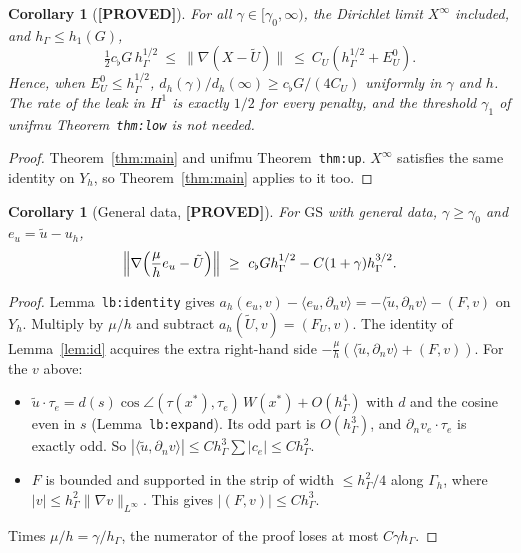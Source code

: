 \documentclass[11pt]{article}
\newtheorem{corollary}[theorem]{Corollary}
\theoremstyle{remark}
\newcommand{\hG}{h_\Gamma}
\newcommand{\Gh}{\Gamma_h}
\newcommand{\Yh}{Y_h}
\newcommand{\norm}[1]{\|#1\|}
\newcommand{\ip}[2]{\langle #1,#2\rangle}
\newcommand{\dn}{\partial_n}
\newcommand{\Ut}{\tilde U}
\newcommand{\ut}{\tilde u}
\newcommand{\lab}[1]{\textbf{[#1]}}
\newcommand{\GS}{\mathrm{GS}}
\begin{document}
\begin{corollary}[\lab{PROVED}]\label{cor:two}
For all $\gamma\in[\gamma_0,\infty)$, the Dirichlet limit $X^\infty$ included, and $\hG\le h_1(G)$,
\[
\tfrac12c_\flat G\,\hG^{1/2}\ \le\ \norm{\nabla(X-\Ut)}\ \le\ C_U(\hG^{1/2}+E^0_U).
\]
Hence, when $E^0_U\le\hG^{1/2}$, $d_h(\gamma)/d_h(\infty)\ge c_\flat G/(4C_U)$ uniformly in $\gamma$ and $h$. The rate of the leak in $H^1$ is exactly $1/2$ for every penalty, and the threshold $\gamma_1$ of unifmu Theorem~\texttt{thm:low} is not needed.
\end{corollary}
\begin{proof}
Theorem~\ref{thm:main} and unifmu Theorem~\texttt{thm:up}. $X^\infty$ satisfies the same identity on $\Yh$, so Theorem~\ref{thm:main} applies to it too.
\end{proof}

\begin{corollary}[General data, \lab{PROVED}]\label{cor:gen}
For $\GS$ with general data, $\gamma\ge\gamma_0$ and $e_u=\ut-u_h$,
\[
\Bigl\|\nabla\Bigl(\frac\mu he_u-\Ut\Bigr)\Bigr\|\ \ge\ c_\flat G\hG^{1/2}-C(1+\gamma)\hG^{3/2}.
\]
\end{corollary}
\begin{proof}
Lemma~\texttt{lb:identity} gives $a_h(e_u,v)-\ip{e_u}{\dn v}=-\ip{\ut}{\dn v}-(F,v)$ on $\Yh$. Multiply by $\mu/h$ and subtract $a_h(\Ut,v)=(F_U,v)$. The identity of Lemma~\ref{lem:id} acquires the extra right-hand side $-\frac\mu h(\ip{\ut}{\dn v}+(F,v))$. For the $v$ above:
\begin{itemize}
\item $\ut\cdot\tau_e=d(s)\cos\angle(\tau(x^\ast),\tau_e)\,W(x^\ast)+O(\hG^4)$ with $d$ and the cosine even in $s$ (Lemma~\texttt{lb:expand}). Its odd part is $O(\hG^3)$, and $\dn v_e\cdot\tau_e$ is exactly odd. So $|\ip{\ut}{\dn v}|\le C\hG^3\sum|c_e|\le C\hG^2$.
\item $F$ is bounded and supported in the strip of width $\le\hG^2/4$ along $\Gh$, where $|v|\le\hG^2\norm{\nabla v}_{L^\infty}$. This gives $|(F,v)|\le C\hG^3$.
\end{itemize}
Times $\mu/h=\gamma/\hG$, the numerator of the proof loses at most $C\gamma\hG$.
\end{proof}
\end{document}

